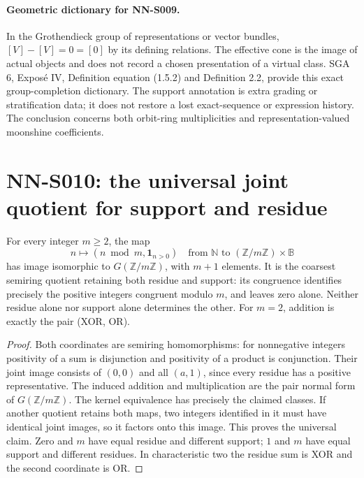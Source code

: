 \paragraph{Geometric dictionary for NN-S009.}
In the Grothendieck group of representations or vector bundles,
$[V]-[V]=0=[0]$ by its defining relations. The effective cone is
the image of actual objects and does not record a chosen
presentation of a virtual class. SGA 6, Expos\'e IV, Definition
equation (1.5.2) and Definition 2.2, provide this exact group-completion
dictionary. The support annotation is extra grading or
stratification data; it does not restore a lost exact-sequence
or expression history. The conclusion concerns both orbit-ring
multiplicities and representation-valued moonshine coefficients.

\section{NN-S010: the universal joint quotient for support and residue}
\label{sec:NN-S010}

\begin{theorem}[NN-S010]
For every integer $m\geq2$, the map
\[
 n\longmapsto(n\bmod m,\mathbf1_{n>0})
 \quad\text{from }\mathbb N\text{ to }(\mathbb Z/m\mathbb Z)\times\mathbb B
\]
has image isomorphic to $G(\mathbb Z/m\mathbb Z)$, with $m+1$
elements. It is the coarsest semiring quotient retaining both
residue and support: its congruence identifies precisely the
positive integers congruent modulo $m$, and leaves zero alone.
Neither residue alone nor support alone determines the other.
For $m=2$, addition is exactly the pair (XOR, OR).
\end{theorem}

\begin{proof}
Both coordinates are semiring homomorphisms: for nonnegative
integers positivity of a sum is disjunction and positivity of a
product is conjunction. Their joint image consists of $(0,0)$
and all $(a,1)$, since every residue has a positive representative.
The induced addition and multiplication are the pair normal form
of $G(\mathbb Z/m\mathbb Z)$. The kernel equivalence has precisely
the claimed classes. If another quotient retains both maps, two
integers identified in it must have identical joint images, so
it factors onto this image. This proves the universal claim.
Zero and $m$ have equal residue and different support; $1$ and
$m$ have equal support and different residues. In characteristic
two the residue sum is XOR and the second coordinate is OR.
\end{proof}

